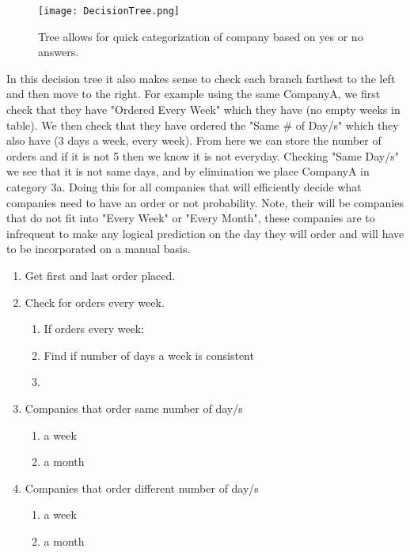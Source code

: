 \documentclass[12pt]{article}
\begin{document}
\begin{figure}[!h] \label{highOrder}
\center
\texttt{[image: DecisionTree.png]}
\caption{\label{math} 
Tree allows for quick categorization of company based on yes or no answers.}
\end{figure}

In this decision tree it also makes sense to check each branch farthest to the left and then move to the right. For example using the same CompanyA, we first check that they have "Ordered Every Week" which they have (no empty weeks in table). We then check that they have ordered the "Same \# of Day/s" which they also have (3 days a week, every week). From here we can store the number of orders and if it is not 5 then we know it is not everyday. Checking "Same Day/s" we see that it is not same days, and by elimination we place CompanyA in category 3a. Doing this for all companies that will efficiently decide what companies need to have an order or not probability. Note, their will be companies that do not fit into "Every Week" or "Every Month", these companies are to infrequent to make any logical prediction on the day they will order and will have to be incorporated on a manual basis. 

\begin{enumerate}
   \item Get first and last order placed.
   \item Check for orders every week.
   \begin{enumerate}
     \item If orders every week:
     \item Find if number of days a week is consistent
     \item 
   \end{enumerate}
   \item Companies that order same number of day/s
   \begin{enumerate}
     \item a week
     \item a month
   \end{enumerate}
   \item Companies that order different number of day/s
   \begin{enumerate}
     \item a week
     \item a month
   \end{enumerate}
\end{enumerate}
\end{document}
